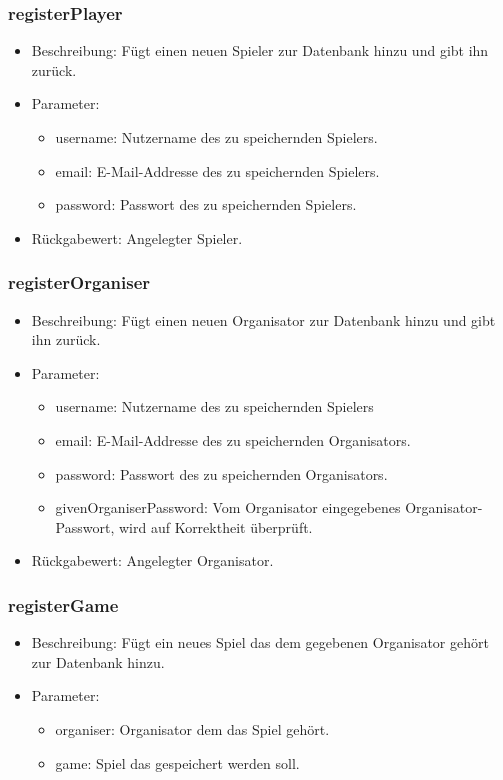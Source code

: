 \documentclass[a4paper]{scrreprt}
\begin{document}
	\subsubsection{registerPlayer}
	\begin{itemize}
		\item Beschreibung: Fügt einen neuen Spieler zur Datenbank hinzu und gibt ihn zurück.
		\item Parameter:
		\begin{itemize}
			\item username: Nutzername des zu speichernden Spielers.
			\item email: E-Mail-Addresse des zu speichernden Spielers.
			\item password: Passwort des zu speichernden Spielers.
		\end{itemize}
		\item Rückgabewert: Angelegter Spieler.
	\end{itemize}

	\subsubsection{registerOrganiser}
	\begin{itemize}
		\item Beschreibung: Fügt einen neuen Organisator zur Datenbank hinzu und gibt ihn zurück.
		\item Parameter:
		\begin{itemize}
			\item username: Nutzername des zu speichernden Spielers
			\item email: E-Mail-Addresse des zu speichernden Organisators.
			\item password: Passwort des zu speichernden Organisators.
			\item givenOrganiserPassword: Vom Organisator eingegebenes Organisator-Passwort, wird auf Korrektheit überprüft.
		\end{itemize}
		\item Rückgabewert: Angelegter Organisator.
	\end{itemize}

	\subsubsection{registerGame}
	\begin{itemize}
		\item Beschreibung: Fügt ein neues Spiel das dem gegebenen Organisator gehört zur Datenbank hinzu.
		\item Parameter:
		\begin{itemize}
			\item organiser: Organisator dem das Spiel gehört.
			\item game: Spiel das gespeichert werden soll.
		\end{itemize}
	\end{itemize}
\end{document}
